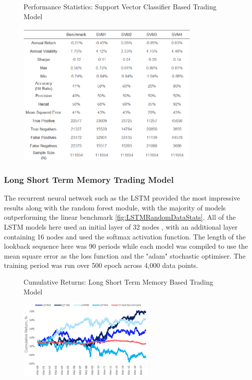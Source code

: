 \documentclass[11pt]{article}
\begin{document}
\begin{figure}[h]
    \centering
	\caption{Performance Statistics: Support Vector Classifier Based Trading Model}    
	\includegraphics[width=0.8\textwidth]{SVMRandomDataStatsv3}
    \label{fig:SVMRandomDataStats}
     \caption*{}
\end{figure}

\clearpage
\subsubsection{Long Short Term Memory Trading Model}
The recurrent neural network such as the LSTM provided the most impressive results along with the random forest module, with the majority of models outperforming the linear benchmark \ref{fig:LSTMRandomDataStats}. All of the LSTM models here used an initial layer of 32 nodes , with an additional layer containing 16 nodes and used the softmax activation function. The length of the lookback sequence here was 90 periods while each model was compiled to use the mean square error as the loss function and the "adam" stochastic optimiser. The training period was run over 500 epoch across 4,000 data points. 
\begin{figure}[h]
    \centering
	\caption{Cumulative Returns: Long Short Term Memory Based Trading Model}    
	\includegraphics[width=0.6\textwidth]{LSTMRandomDataResults}
    \label{fig:LSTMRandomDataResults}
     \caption*{}
\end{figure}
\end{document}
